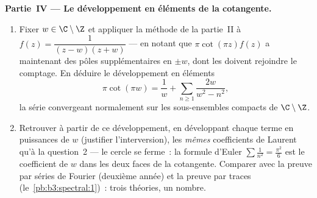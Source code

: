 \begin{problem}
\medskip
\noindent\textbf{Partie~IV --- Le développement en éléments
 de la cotangente.}
\begin{enumerate}[resume]
  \item Fixer $w \in \C\setminus\Z$ et appliquer la méthode
        de la partie~II à $f(z) = \dfrac{1}{(z - w)(z +
        w)}$ --- en notant que $\pi\cot(\pi z)f(z)$ a
        maintenant des pôles  supplémentaires en
        $\pm w$, dont les  doivent rejoindre le
        comptage. En déduire le développement en éléments
        \[
        \pi\cot(\pi w) = \frac1w +
        \sum_{n\geq1}\frac{2w}{w^2 - n^2},
        \]
        la série convergeant normalement sur les
        sous-ensembles compacts de $\C\setminus\Z$.
  \item Retrouver à partir de ce développement, en
        développant chaque terme en puissances de $w$
        (justifier l'interversion), les \emph{mêmes}
        coefficients de Laurent qu'à la question~2 --- le
        cercle se ferme~: la formule d'Euler $\sum\frac1{n^2}
        = \frac{\pi^2}6$ est le coefficient de $w$ dans les
        deux faces de la cotangente. Comparer avec la
        preuve par séries de Fourier (deuxième année) et la
        preuve par traces (le~\cref{pb:b3:spectral:1})~:
        trois théories, un nombre.
\end{enumerate}


\end{problem}
